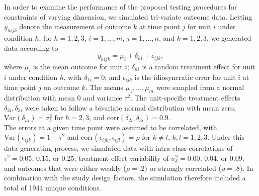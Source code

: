 \documentclass[12pt]{article}
\begin{document}
In order to examine the performance of the proposed testing procedures
for constraints of varying dimension, we simulated tri-variate outcome
data. Letting \(y_{hijk}\) denote the measurement of outcome \(k\) at
time point \(j\) for unit \(i\) under condition \(h\), for
\(h = 1,2,3\), \(i = 1,...,m\), \(j = 1,...,n\), and \(k = 1,2,3\), we
generated data according to \begin{equation}
\label{eq:data_generating_model}
y_{hijk} = \mu_{i} + \delta_{hi} + \epsilon_{ijk},
\end{equation} where \(\mu_i\) is the mean outcome for unit \(i\);
\(\delta_{hi}\) is a random treatment effect for unit \(i\) under
condition \(h\), with \(\delta_{1i} = 0\); and \(\epsilon_{ijk}\) is the
idiosyncratic error for unit \(i\) at time point \(j\) on outcome \(k\).
The means \(\mu_1,...,\mu_m\) were sampled from a normal distribution
with mean 0 and variance \(\tau^2\). The unit-specific treatment effects
\(\delta_{2i},\delta_{3i}\) were taken to follow a bivariate normal
distribution with mean zero,
\(\text{Var}\left(\delta_{hi}\right) = \sigma_\delta^2\) for
\(h = 2,3\), and
\(\text{corr}\left(\delta_{2i},\delta_{3i}\right) = 0.9\).\\
The errors at a given time point were assumed to be correlated, with
\(\text{Var}\left(\epsilon_{ijk}\right) = 1 - \tau^2\) and
\(\text{corr}\left(\epsilon_{ijk}, \epsilon_{ijl}\right) = \rho\) for
\(k\neq l\), \(k,l = 1,2,3\). Under this data-generating process, we
simulated data with intra-class correlations of \(\tau^2 = 0.05\), 0.15,
or 0.25; treatment effect variability of \(\sigma_\delta^2 = 0.00\),
0.04, or 0.09; and outcomes that were either weakly (\(\rho = .2\)) or
strongly correlated (\(\rho = .8\)). In combination with the study
design factors, the simulation therefore included a total of 1944 unique
conditions.
\end{document}
